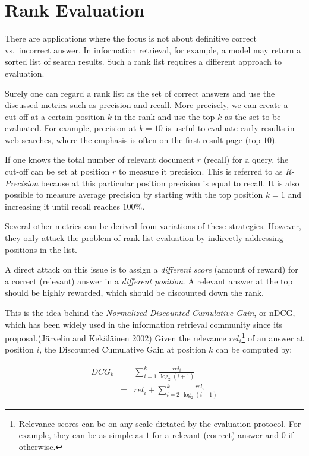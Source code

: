 \documentclass[
  letterpaper,
]{scrbook}
\begin{document}
\section{Rank Evaluation}\label{rank-evaluation}

There are applications where the focus is not about definitive correct
vs.~incorrect answer. In information retrieval, for example, a model may
return a sorted list of search results. Such a rank list requires a
different approach to evaluation.

Surely one can regard a rank list as the set of correct answers and use
the discussed metrics such as precision and recall. More precisely, we
can create a cut-off at a certain position \(k\) in the rank and use the
top \(k\) as the set to be evaluated. For example, precision at \(k=10\)
is useful to evaluate early results in web searches, where the emphasis
is often on the first result page (top \(10\)).

If one knows the total number of relevant document \(r\) (recall) for a
query, the cut-off can be set at position \(r\) to measure it precision.
This is referred to as \emph{R-Precision} because at this particular
position precision is equal to recall. It is also possible to measure
average precision by starting with the top position \(k=1\) and
increasing it until recall reaches \(100\%\).

Several other metrics can be derived from variations of these
strategies. However, they only attack the problem of rank list
evaluation by indirectly addressing positions in the list.

A direct attack on this issue is to assign a \emph{different score}
(amount of reward) for a correct (relevant) answer in a \emph{different
position}. A relevant answer at the top should be highly rewarded, which
should be discounted down the rank.

This is the idea behind the \emph{Normalized Discounted Cumulative
Gain}, or nDCG, which has been widely used in the information retrieval
community since its proposal.(Järvelin and Kekäläinen 2002) Given the
relevance \(rel_i\)\footnote{Relevance scores can be on any scale
  dictated by the evaluation protocol. For example, they can be as
  simple as \(1\) for a relevant (correct) answer and \(0\) if
  otherwise.} of an answer at position \(i\), the Discounted Cumulative
Gain at position \(k\) can be computed by:

\[\begin{aligned}
  DCG_k
  & = & \sum_{i=1}^{k} \frac{rel_i}{\log_2(i+1)} \\
  & = & rel_i + \sum_{i=2}^{k} \frac{rel_i}{\log_2(i+1)}
\end{aligned}\]
\end{document}

